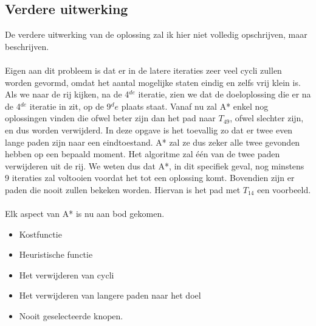 \documentclass[alternative-exam.tex]{subfiles}
\begin{document}
\subsection{Verdere uitwerking}
De verdere uitwerking van de oplossing zal ik hier niet volledig opschrijven, maar beschrijven.\\\\
Eigen aan dit probleem is dat er in de latere iteraties zeer veel cycli zullen worden gevormd, omdat het aantal mogelijke staten eindig en zelfs vrij klein is.
Als we naar de rij kijken, na de 4$^{de}$ iteratie, zien we dat de doeloplossing die er na de 4$^{de}$ iteratie in zit, op de 9$^de$ plaats staat. Vanaf nu zal A* enkel nog oplossingen vinden die ofwel beter zijn dan het pad naar $T_{49}$, ofwel slechter zijn, en dus worden verwijderd. In deze opgave is het toevallig zo dat er twee even lange paden zijn naar een eindtoestand. A* zal ze dus zeker alle twee gevonden hebben op een bepaald moment. Het algoritme zal één van de twee paden verwijderen uit de rij. We weten dus dat A*, in dit specifiek geval, nog minstens 9 iteraties zal voltooien voordat het tot een oplossing komt. Bovendien zijn er paden die nooit zullen bekeken worden. Hiervan is het pad met $T_{14}$ een voorbeeld.\\\\
Elk aspect van A* is nu aan bod gekomen.
\begin{itemize}
\item Kostfunctie
\item Heuristische functie
\item Het verwijderen van cycli
\item Het verwijderen van langere paden naar het doel
\item Nooit geselecteerde knopen.
\end{itemize}
\end{document}
